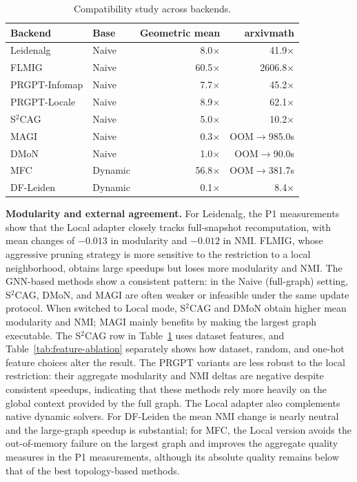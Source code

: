 \documentclass[conference]{IEEEtran}
\theoremstyle{definition}
\begin{document}
\begin{table}[t]
\centering
\caption{Compatibility study across backends.}
\label{tab:main-results}
\setlength{\tabcolsep}{2pt}
\scriptsize
\begin{tabular}{@{}llrr@{}}
\toprule
\textbf{Backend} & \textbf{Base} & \textbf{Geometric mean} &
\textbf{arxivmath} \\
\midrule
Leidenalg      & Naive   & 8.0$\times$  & 41.9$\times$ \\
FLMIG          & Naive   & 60.5$\times$ & 2606.8$\times$ \\
PRGPT-Infomap  & Naive   & 7.7$\times$  & 45.2$\times$ \\
PRGPT-Locale   & Naive   & 8.9$\times$  & 62.1$\times$ \\
S$^2$CAG       & Naive   & 5.0$\times$  & 10.2$\times$ \\
MAGI           & Naive   & 0.3$\times$  & OOM$\rightarrow$985.0s \\
DMoN           & Naive   & 1.0$\times$  & OOM$\rightarrow$90.0s \\
MFC            & Dynamic & 56.8$\times$ & OOM$\rightarrow$381.7s \\
DF-Leiden      & Dynamic & 0.1$\times$  & 8.4$\times$ \\
\bottomrule
\end{tabular}
\end{table}

\textbf{Modularity and external agreement.}
For Leidenalg, the P1 measurements show that the Local adapter closely tracks
full-snapshot recomputation, with mean changes of $-0.013$ in modularity and
$-0.012$ in NMI.
FLMIG, whose aggressive pruning strategy is more sensitive to the restriction
to a local neighborhood, obtains large speedups but loses more modularity and
NMI.
The GNN-based methods show a consistent pattern: in the Naive (full-graph)
setting, S$^2$CAG, DMoN, and MAGI are often weaker or infeasible under the
same update protocol.
When switched to Local mode, S$^2$CAG and DMoN obtain higher mean modularity
and NMI; MAGI mainly benefits by making the largest graph executable. The
S$^2$CAG row in Table~\ref{tab:main-results} uses dataset features, and
Table~\ref{tab:feature-ablation} separately shows how dataset, random, and
one-hot feature choices alter the result.
The PRGPT variants are less robust to the local restriction: their aggregate
modularity and NMI deltas are negative despite consistent speedups, indicating
that these methods rely more heavily on the global context provided by the full
graph.
The Local adapter also complements native dynamic solvers. For DF-Leiden the
mean NMI change is nearly neutral and the large-graph speedup is substantial;
for MFC, the Local version avoids the out-of-memory failure on the largest
graph and improves the aggregate quality measures in
the P1 measurements, although its absolute quality remains below that of the
best topology-based methods.
\end{document}
